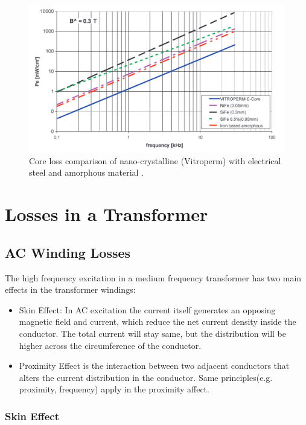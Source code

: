 \documentclass[a4paper, 11pt]{article} %
\begin{document}
\begin{figure}[]
  \centering
    \includegraphics[scale=0.3]{vitroperm_core_losses_vs_freq}
  \caption{Core loss comparison of nano-crystalline (Vitroperm) with electrical steel and amorphous material \cite{vitroterm_manual}.}
  \label{core-loss-log}
\end{figure}

\section{Losses in a Transformer}

\subsection{AC Winding Losses}

The high frequency excitation in a medium frequency transformer has two main effects in the transformer windings:
\begin{itemize}
  \item Skin Effect: In AC excitation the current itself generates an opposing magnetic field and current, which reduce the net current density inside the conductor. The total current will stay same, but the distribution will be higher across the circumference of the conductor.
  \item Proximity Effect is the interaction between two adjacent conductors that alters the current distribution in the conductor. Same principles(e.g. proximity, frequency) apply in the proximity affect.
\end{itemize}

\subsubsection{Skin Effect}
\end{document}
